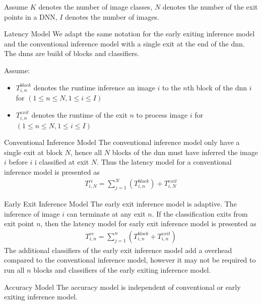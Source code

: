 Assume $ K $ denotes the number of image classes, $ N $ denotes the number of the exit points in a DNN, $ I $ denotes the number of images.
	\begin{enumdescript}
		\item[Latency Model] We adapt the same notation for the early exiting inference model and the conventional inference model with a single exit at the end of the \gls{dnn}. The \gls{dnn}s are build of blocks and classifiers.
		
		Assume:
		\begin{itemize}
			\item $T_{i,n}^{block}$ denotes the runtime inference an image $ i $ to the $ n $th block of the \gls{dnn} $ i $ for $ \left(1\leq n \leq N, 1 \leq i \leq I\right) $
			\item $T_{i,n}^{exit}$ denotes the runtime of the exit $ n $  to process image $i$ for $ \left(1\leq n \leq N, 1 \leq i \leq I\right) $
		\end{itemize}
		\begin{enumdescript}
			\item[Conventional Inference Model] The conventional inference model only have a single exit at block $ N $, hence all $ N $ blocks of the \gls{dnn} must have inferred the image $ i $ before $ i $ i classified at exit $ N $. Thus the latency model for a conventional inference model is presented as
			\begin{align}
			T^{ci}_{i,N}= \sum_{j=1}^{N} \left(T_{i,n}^{block}\right) + T_{i,N}^{exit}
			\end{align}
			\item[Early Exit Inference Model] The early exit inference model is adaptive. The inference of image $ i $ can terminate at any exit $ n $. If the classification exits from exit point $ n $, then the latency model for early exit inference model is presented as
			\begin{align}
			T_{i,n}^{ee}=\sum_{j=1}^{n} \left(T_{i,n}^{block} + T_{i,n}^{exit} \right) 
			\end{align}
			The additional classifiers of the early exit inference model add a overhead compared to the conventional inference model, however it may not be required to run all $ n $ blocks and classifiers of the early exiting inference model. 
		\end{enumdescript}
		
					
		
		\item[Accuracy Model] The accuracy model is independent of conventional or early exiting inference model. 
		

\end{enumdescript}
